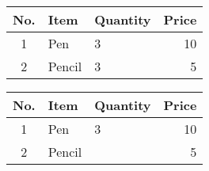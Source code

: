 \documentclass{article}
\begin{document}
	\begin{tabular}{|c|l|l|r|}
		\hline
		No. & Item & Quantity & Price \\
		\hline
		1 & Pen & 3 & 10 \\
		\hline
		2 & Pencil & 3 & 5 \\
		\hline
	\end{tabular}


	\begin{tabular}{|c|l|l|r|}
		\hline
		No. & Item & Quantity & Price \\
		\hline
		1 & Pen & 3 & 10 \\
		\cline{1-2} \cline{4-4} %
		2 & Pencil &  & 5 \\
		\hline
	\end{tabular}
\end{document}
